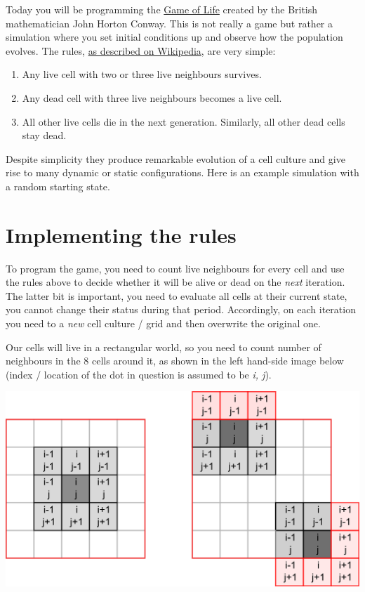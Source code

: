 \documentclass[
]{book}
\providecommand{\tightlist}{%
  \setlength{\itemsep}{0pt}\setlength{\parskip}{0pt}}
\begin{document}
Today you will be programming the \href{https://en.wikipedia.org/wiki/Conway\%27s_Game_of_Life}{Game of Life} created by the British mathematician John Horton Conway. This is not really a game but rather a simulation where you set initial conditions up and observe how the population evolves. The rules, \href{https://en.wikipedia.org/wiki/Conway\%27s_Game_of_Life}{as described on Wikipedia}, are very simple:

\begin{enumerate}
\def\labelenumi{\arabic{enumi}.}
\tightlist
\item
  Any live cell with two or three live neighbours survives.
\item
  Any dead cell with three live neighbours becomes a live cell.
\item
  All other live cells die in the next generation. Similarly, all other dead cells stay dead.
\end{enumerate}

Despite simplicity they produce remarkable evolution of a cell culture and give rise to many dynamic or static configurations. Here is an example simulation with a random starting state.

\hypertarget{implementing-the-rules}{%
\section{Implementing the rules}\label{implementing-the-rules}}

To program the game, you need to count live neighbours for every cell and use the rules above to decide whether it will be alive or dead on the \emph{next} iteration. The latter bit is important, you need to evaluate all cells at their current state, you cannot change their status during that period. Accordingly, on each iteration you need to a \emph{new} cell culture / grid and then overwrite the original one.

Our cells will live in a rectangular world, so you need to count number of neighbours in the 8 cells around it, as shown in the left hand-side image below (index / location of the dot in question is assumed to be \emph{i, j}).

\begin{center}\includegraphics[width=16.68in]{images/game-of-life-grid} \end{center}
\end{document}
